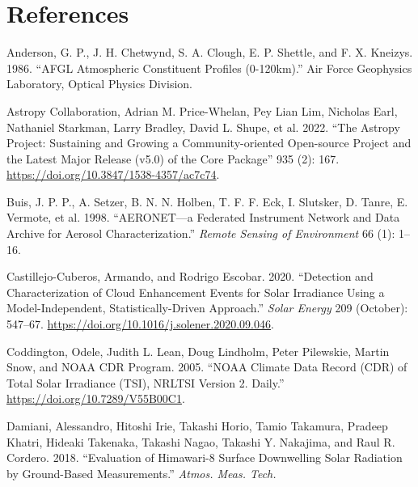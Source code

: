 \documentclass[
]{article}
\newlength{\cslhangindent}
\newlength{\cslentryspacingunit} %
\newenvironment{CSLReferences}[2] %
 {%
  \setlength{\parindent}{0pt}
  \ifodd #1
  \let\oldpar\par
  \def\par{\hangindent=\cslhangindent\oldpar}
  \fi
  \setlength{\parskip}{#2\cslentryspacingunit}
 }%
 {}
\begin{document}
\hypertarget{references}{%
\section*{References}\label{references}}

\hypertarget{refs}{}
\begin{CSLReferences}{1}{0}
\leavevmode{}%
Anderson, G. P., J. H. Chetwynd, S. A. Clough, E. P. Shettle, and F. X. Kneizys. 1986. {``{AFGL} Atmospheric Constituent Profiles (0-120km).''} Air Force Geophysics Laboratory, Optical Physics Division.

\leavevmode{}%
Astropy Collaboration, Adrian M. Price-Whelan, Pey Lian Lim, Nicholas Earl, Nathaniel Starkman, Larry Bradley, David L. Shupe, et al. 2022. {``{The Astropy Project: Sustaining and Growing a Community-oriented Open-source Project and the Latest Major Release (v5.0) of the Core Package}''} 935 (2): 167. \url{https://doi.org/10.3847/1538-4357/ac7c74}.

\leavevmode{}%
Buis, J. P. P., A. Setzer, B. N. N. Holben, T. F. F. Eck, I. Slutsker, D. Tanre, E. Vermote, et al. 1998. {``AERONET---a Federated Instrument Network and Data Archive for Aerosol Characterization.''} \emph{Remote Sensing of Environment} 66 (1): 1--16.

\leavevmode{}%
Castillejo-Cuberos, Armando, and Rodrigo Escobar. 2020. {``Detection and Characterization of Cloud Enhancement Events for Solar Irradiance Using a Model-Independent, Statistically-Driven Approach.''} \emph{Solar Energy} 209 (October): 547--67. \url{https://doi.org/10.1016/j.solener.2020.09.046}.

\leavevmode{}%
Coddington, Odele, Judith L. Lean, Doug Lindholm, Peter Pilewskie, Martin Snow, and NOAA CDR Program. 2005. {``{NOAA} Climate Data Record ({CDR}) of Total Solar Irradiance ({TSI}), {NRLTSI} Version 2. {D}aily.''} \url{https://doi.org/10.7289/V55B00C1}.

\leavevmode{}%
Damiani, Alessandro, Hitoshi Irie, Takashi Horio, Tamio Takamura, Pradeep Khatri, Hideaki Takenaka, Takashi Nagao, Takashi Y. Nakajima, and Raul R. Cordero. 2018. {``Evaluation of Himawari-8 Surface Downwelling Solar Radiation by Ground-Based Measurements.''} \emph{Atmos. Meas. Tech.}


\end{CSLReferences}
\end{document}
